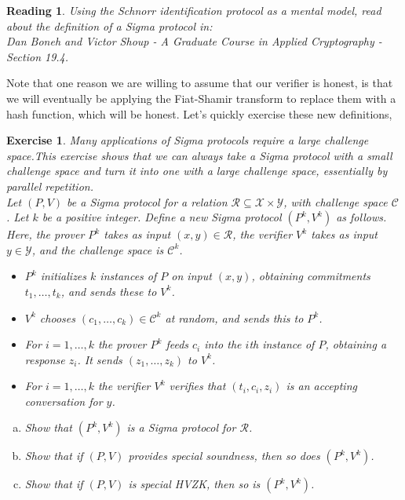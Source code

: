 \documentclass[12pt]{article}
\newtheorem{exercise}{Exercise}
\newtheorem{reading}{Reading}
\theoremstyle{definition}
\theoremstyle{remark}
\theoremstyle{definition}
\begin{document}
\begin{reading}
Using the Schnorr identification protocol as a mental model, read about the definition of a Sigma protocol in:\\
Dan Boneh and Victor Shoup - A Graduate Course in
Applied Cryptography - Section 19.4.
\end{reading}

Note that one reason we are willing to assume that our verifier is honest, is that we will eventually be applying the Fiat-Shamir transform to replace them with a hash function, which will be honest. Let's quickly exercise these new definitions,

\begin{exercise}
Many applications of Sigma protocols require a large challenge space.This exercise shows that we can always take a Sigma protocol with a small challenge space and turn it into one with a large challenge space, essentially by parallel repetition.\\
Let $(P, V)$ be a Sigma protocol for a relation $\mathcal{R}\subseteq \mathcal{X}\times\mathcal{Y}$, with challenge space $\mathcal{C}$. Let $k$ be a positive integer. Define a new Sigma protocol $(P^k, V^k)$ as follows. Here, the prover $P^k$ takes as input $(x, y)\in\mathcal{R}$, the verifier $V^k$ takes as input $y\in\mathcal{Y}$, and the challenge space is $\mathcal{C}^k$.
\begin{itemize}
\item $P^k$ initializes $k$ instances of $P$ on input $(x, y)$, obtaining commitments $t_1,\ldots, t_k$, and sends these to $V^k$.
\item $V^k$ chooses $(c_1,\ldots, c_k)\in\mathcal{C}^k$ at random, and sends this to $P^k$.
\item For $i=1,\ldots, k$ the prover $P^k$ feeds $c_i$ into the $i$th instance of $P$, obtaining a response $z_i$. It sends $(z_1,\ldots, z_k)$ to $V^k$.
\item For $i=1,\ldots, k$ the verifier $V^k$ verifies that $(t_i, c_i, z_i)$ is an accepting conversation for $y$.
\end{itemize}
\begin{enumerate}[(a)]
\item Show that $(P^k, V^k)$ is a Sigma protocol for $\mathcal{R}$.
\item Show that if $(P, V)$ provides special soundness, then so does $(P^k, V^k)$.
\item Show that if $(P, V)$ is special HVZK, then so is $(P^k, V^k)$.
\end{enumerate}
\end{exercise}
\end{document}
